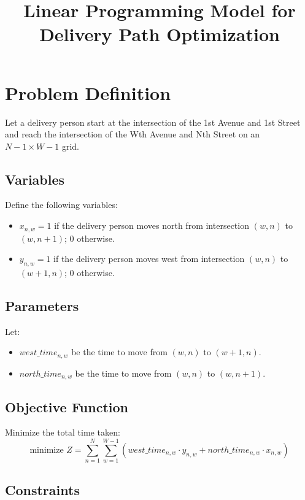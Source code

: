 \documentclass{article}
\begin{document}
\title{Linear Programming Model for Delivery Path Optimization}
\author{}
\date{}
\maketitle

\section*{Problem Definition}

Let a delivery person start at the intersection of the 1st Avenue and 1st Street and reach the intersection of the Wth Avenue and Nth Street on an $N-1 \times W-1$ grid.

\subsection*{Variables}

Define the following variables:
\begin{itemize}
    \item $x_{n,w} = 1$ if the delivery person moves north from intersection $(w,n)$ to $(w,n+1)$; 0 otherwise.
    \item $y_{n,w} = 1$ if the delivery person moves west from intersection $(w,n)$ to $(w+1,n)$; 0 otherwise.
\end{itemize}

\subsection*{Parameters}

Let:
\begin{itemize}
    \item $west\_time_{n,w}$ be the time to move from $(w,n)$ to $(w+1,n)$.
    \item $north\_time_{n,w}$ be the time to move from $(w,n)$ to $(w,n+1)$.
\end{itemize}

\subsection*{Objective Function}

Minimize the total time taken:
\[
\text{minimize } Z = \sum_{n=1}^{N} \sum_{w=1}^{W-1} (west\_time_{n,w} \cdot y_{n,w} + north\_time_{n,w} \cdot x_{n,w})
\]

\subsection*{Constraints}
\end{document}
